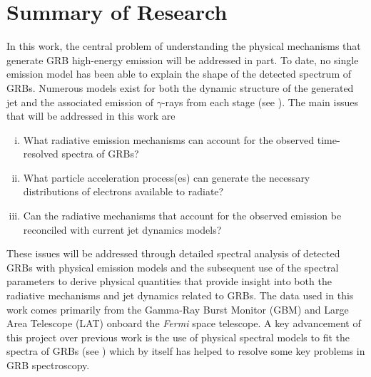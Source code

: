 \section{Summary of Research}
In this work, the central problem of understanding the physical
mechanisms that generate GRB high-energy emission will be addressed in
part. To date, no single emission model has been able to explain the
shape of the detected spectrum of GRBs. Numerous models exist for both
the dynamic structure of the generated jet and the associated emission
of $\gamma$-rays from each stage (see ). The main
issues that will be addressed in this work are
\begin{enumerate}[(i)]
\item What radiative emission mechanisms can account for the observed
  time-resolved spectra of GRBs?

\item What particle acceleration process(es) can generate the necessary
  distributions of electrons available to radiate?

\item Can the radiative mechanisms that account for the observed
  emission be reconciled with current jet dynamics models?


\end{enumerate}

These issues will be addressed through detailed spectral analysis of
detected GRBs with physical emission models and the subsequent use of
the spectral parameters to derive physical quantities that provide
insight into both the radiative mechanisms and jet dynamics related to
GRBs. The data used in this work comes primarily from the Gamma-Ray
Burst Monitor (GBM) \cite{Meegan:2009} and Large Area Telescope (LAT)
\cite{Atwood:2009} onboard the {\it Fermi} space telescope. A key
advancement of this project over previous work is the use of physical
spectral models to fit the spectra of GRBs (see ) which
by itself has helped to resolve some key problems in GRB spectroscopy.





